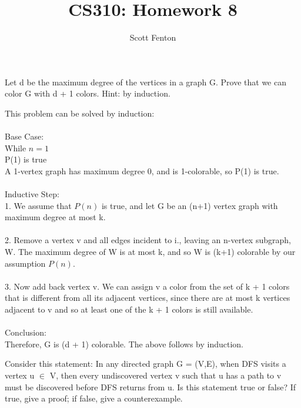 \documentclass[10pt]{article}
\newenvironment{exercise}[2][Exercise]{\begin{trivlist}
\item[\hskip \labelsep {\bfseries #1}\hskip \labelsep {\bfseries #2.}]}{\end{trivlist}}
\newenvironment{solution}[2][Solution]{\begin{trivlist}
\item[\hskip \labelsep {\bfseries #1}\hskip \labelsep {\bfseries #2.}]}{\end{trivlist}}
\theoremstyle{definition}
\begin{document}
 
 
 
\title{CS310: Homework 8}%
\author{Scott Fenton\\ %
} %
 
\maketitle
\begin{exercise}{(1)}
Let d be the maximum degree of the vertices in a graph G. Prove that we can color G with
d + 1 colors. Hint: by induction.\\
\end{exercise}

\begin{solution}{(1)}
This problem can be solved by induction: \\
\\Base Case:\\
While $n = 1$\\
P(1) is true\\
A 1-vertex graph has maximum degree 0, and is 1-colorable, so P(1) is true.\\
\\
Inductive Step:\\
1. We assume that $P(n)$ is true, and let G be an (n+1) vertex graph with maximum degree at most k.\\
\\
2. Remove a vertex v and all edges incident to i., leaving an n-vertex subgraph, W. The maximum degree of W is at most k, and so W is (k+1) colorable by our assumption $P(n)$.\\
\\
3. Now add back vertex v. We can assign v a color from the set of k + 1 colors that is different from all its adjacent vertices, since there are at most k vertices adjacent to v and so at least one of the k + 1 colors is still available.\\
\\
Conclusion:\\
Therefore, G is (d + 1) colorable. The above follows by induction.
\end{solution}


\begin{exercise}{(2)} %
Consider this statement: In any directed graph G = (V,E), when DFS visits a vertex u $\in$ V,
then every undiscovered vertex v such that u has a path to v must be discovered before
DFS returns from u. Is this statement true or false? If true, give a proof; if false, give a
counterexample.\\
\end{exercise}
 
\end{document}
